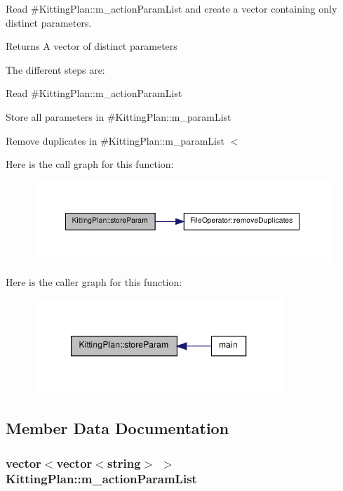 Read \#KittingPlan::m\_\-actionParamList and create a vector containing only distinct parameters. 

\begin{DoxyReturn}{Returns}
A vector of distinct parameters
\end{DoxyReturn}
The different steps are: 
\begin{DoxyItemize}
\item Read \#KittingPlan::m\_\-actionParamList 
\item Store all parameters in \#KittingPlan::m\_\-paramList 
\item Remove duplicates in \#KittingPlan::m\_\-paramList $<$ 
\end{DoxyItemize}

Here is the call graph for this function:\nopagebreak
\begin{figure}[H]
\begin{center}
\leavevmode
\includegraphics[width=376pt]{class_kitting_plan_a76444470a007c13ea215beeb11c3b3ca_cgraph}
\end{center}
\end{figure}




Here is the caller graph for this function:\nopagebreak
\begin{figure}[H]
\begin{center}
\leavevmode
\includegraphics[width=268pt]{class_kitting_plan_a76444470a007c13ea215beeb11c3b3ca_icgraph}
\end{center}
\end{figure}




\subsection{Member Data Documentation}
\hypertarget{class_kitting_plan_a8293312cf9137906c868994b4ade4587}{
\subsubsection[{m\_\-actionParamList}]{\setlength{\rightskip}{0pt plus 5cm}vector$<$vector$<$string$>$ $>$ {\bf KittingPlan::m\_\-actionParamList}}}
\label{class_kitting_plan_a8293312cf9137906c868994b4ade4587}



